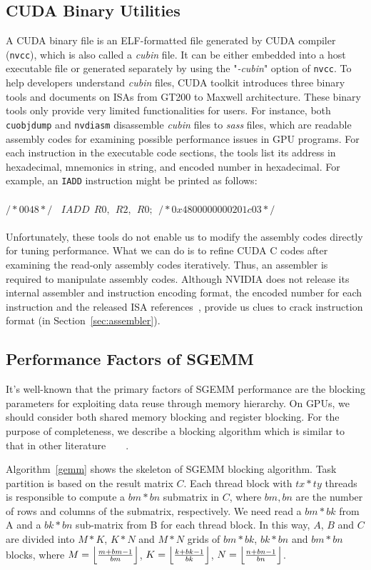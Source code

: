 \documentclass{sig-alternate-05-2015}
\begin{document}
\subsection{CUDA Binary Utilities}
\label{sec:cuda}

A CUDA binary file is an ELF-formatted file generated by CUDA compiler ({\tt nvcc}), which is also called a {\em cubin} file. It can be either embedded into a host executable file or generated separately by using the "{\em -cubin}" option of {\tt nvcc}. To help developers understand {\em cubin} files, CUDA toolkit introduces three binary tools and documents on ISAs from GT200 to Maxwell architecture. These binary tools only provide very limited functionalities for users. For instance, both {\tt cuobjdump} and {\tt nvdiasm} disassemble {\em cubin} files to {\em sass} files, which are readable assembly codes for examining possible performance issues in GPU programs. For each instruction in the executable code sections, the tools list its address in hexadecimal, mnemonics in string, and encoded number in hexadecimal. For example, an {\tt IADD} instruction might be printed as follows: \\\\
$/*0048*/~~~~IADD~~R0,~~R2,~~R0;~~/* 0x4800000000201c03 */$\\\\
Unfortunately, these tools do not enable us to modify the assembly codes directly for tuning performance. What we can do is to refine CUDA C codes after examining the read-only assembly codes iteratively. Thus, an assembler is required to manipulate assembly codes. Although NVIDIA does not release its internal assembler and instruction encoding format, the encoded number for each instruction and the released ISA references~\cite{}, provide us clues to crack instruction format (in Section~\ref{sec:assembler}).


\subsection{Performance Factors of SGEMM}
It's well-known that the primary factors of SGEMM performance are the blocking parameters for exploiting data reuse through memory hierarchy. On GPUs, we should consider both shared memory blocking and register blocking. For the purpose of completeness, we describe a blocking algorithm which is similar to that in other literature~\cite{magma}~\cite{nervana_sgemm_wiki}~\cite{lai}~\cite{tan}.

Algorithm~\ref{gemm} shows the skeleton of SGEMM blocking algorithm. Task partition is based on the result matrix $C$. Each thread block with $tx*ty$ threads is responsible to compute a $bm*bn$ submatrix in $C$, where $bm, bn$ are the number of rows and columns of the submatrix, respectively. We need read a $bm*bk$ from A and a $bk*bn$ sub-matrix from B for each thread block. In this way, $A$, $B$ and $C$ are divided into $M*K$, $K*N$ and $M*N$ grids of $bm*bk$, $bk*bn$ and $bm*bn$ blocks, where $M=\Bigl\lfloor \frac{m+bm-1}{bm} \Bigr\rfloor$, $K=\Bigl\lfloor \frac{k+bk-1}{bk} \Bigr\rfloor$, $N=\Bigl\lfloor \frac{n+bn-1}{bn} \Bigr\rfloor$.
\end{document}
